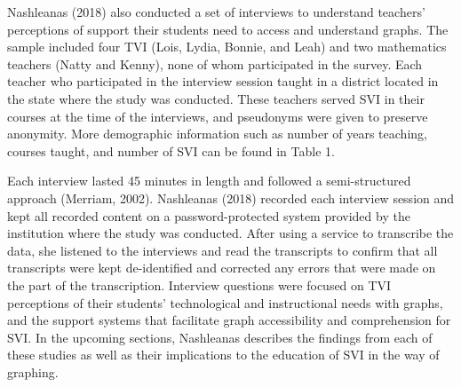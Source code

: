 \documentclass[11.5pt]{sig-alternate} %
\begin{document}
\begin{large}
Nashleanas (2018) also conducted a set of interviews to understand teachers’ perceptions of support their students need to access and understand graphs. The sample included four TVI (Lois, Lydia, Bonnie, and Leah) and two mathematics teachers (Natty and Kenny), none of whom participated in the survey. Each teacher who participated in the interview session taught in a district located in the state where the study was conducted. These teachers served SVI in their courses at the time of the interviews, and pseudonyms were given to preserve anonymity. More demographic information such as number of years teaching, courses taught, and number of SVI can be found in Table 1. 
 
Each interview lasted 45 minutes in length and followed a semi-structured approach (Merriam, 2002). Nashleanas (2018) recorded each interview session and kept all recorded content on a password-protected system provided by the institution where the study was conducted. After using a service to transcribe the data, she listened to the interviews and read the transcripts to confirm that all transcripts were kept de-identified and corrected any errors that were made on the part of the transcription. Interview questions were focused on TVI perceptions of their students’ technological and instructional needs with graphs, and the support systems that facilitate graph accessibility and comprehension for SVI. In the upcoming sections, Nashleanas describes the findings from each of these studies as well as their implications to the education of SVI in the way of graphing.


\end{large}
\end{document}
